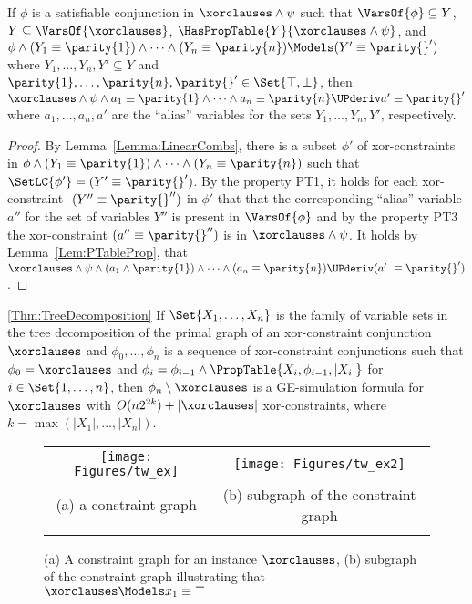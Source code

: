 \begin{lemma}
\label{Lem:PCProp}
If $\phi$ is a satisfiable conjunction in $\xorclauses \wedge \psi$ such that
$\VarsOf{\phi} \subseteq Y$, $Y \subseteq \VarsOf{\xorclauses}$, $\HasPropTable{Y}{\xorclauses \wedge \psi}$,
and $ \phi \wedge (Y_1 \equiv \parity{1}) \wedge \dots \wedge (Y_n \equiv \parity{n}) \Models (Y' \equiv \parity{}')$
where $Y_1,\dots,Y_n,Y' \subseteq Y $
and $\parity{1},\dots,\parity{n},\parity{}' \in \Set{\top,\bot}$, 
then $\xorclauses \wedge \psi \wedge a_1 \equiv \parity{1} \wedge \dots \wedge a_n \equiv
\parity{n} \UPderiv a' \equiv \parity{}'$
where $ a_1,\dots,a_n,a' $ are the ``alias'' variables for the sets $Y_1,\dots,Y_n,Y'$, respectively.
\end{lemma}

\begin{proof}
By Lemma~\ref{Lemma:LinearCombs}, there is a subset $\phi'$ of xor-constraints in $\phi \wedge (Y_1 \equiv \parity{1}) \wedge \dots \wedge (Y_n \equiv \parity{n}) $ such that $ \SetLC{\phi'} = (Y' \equiv \parity{}') $.
By the property PT1, it holds for each xor-constraint $ (Y'' \equiv \parity{}'') $ in $\phi'$ 
that that the corresponding ``alias'' variable $ a'' $ for the set of
variables $Y''$ is present in $\VarsOf{\phi}$
and by the property PT3 the xor-constraint $ (a'' \equiv
    \parity{}'') $ is in $ \xorclauses \wedge \psi$.
It holds by Lemma~\ref{Lem:PTableProp}, that $ \xorclauses \wedge \psi \wedge (a_1 \wedge \parity{1}) \wedge \dots \wedge (a_n \equiv \parity{n}) \UPderiv
(a' \equiv \parity{}') $.
\end{proof}


\begin{retheorem}{\ref{Thm:TreeDecomposition}}
If $\Set{X_1, \dots, X_n} $ is the family of variable sets in the tree
decomposition of the primal graph of an xor-constraint conjunction $
\xorclauses$ and 
$\phi_0, \dots, \phi_n$ is a sequence of xor-constraint conjunctions
such that $ \phi_0 = \xorclauses $ and $ \phi_i = \phi_{i-1} \wedge \PropTable{X_i, \phi_{i-1}, |X_i|} $ for $i \in \Set{1,\dots,n}$, then $ \phi_n \setminus \xorclauses $ is a GE-simulation formula for
$\xorclauses$ with $O(n {2^{2k}}) + |\xorclauses|$ xor-constraints, where
$k = \max(|X_1|, \dots, |X_n|) $.  
\end{retheorem}

\begin{figure}[ht]
\centering
\begin{tabular}{c@{\qquad}c}
\texttt{[image: Figures/tw\_ex]}
&
\texttt{[image: Figures/tw\_ex2]}
\\
(a) a constraint graph
&
(b) subgraph of the constraint graph
\\
\\
\end{tabular}
\caption{(a) A constraint graph for an instance $\xorclauses$, (b) subgraph of the constraint graph illustrating that $\xorclauses \Models x_1 \equiv \top$}
\label{Fig:TWEx}
\end{figure}

